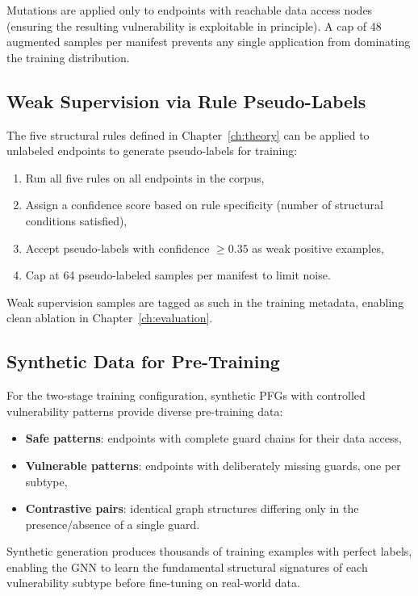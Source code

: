 Mutations are applied only to endpoints with reachable data access nodes (ensuring the resulting vulnerability is exploitable in principle). A cap of 48 augmented samples per manifest prevents any single application from dominating the training distribution.

\subsection{Weak Supervision via Rule Pseudo-Labels}

The five structural rules defined in Chapter~\ref{ch:theory} can be applied to unlabeled endpoints to generate pseudo-labels for training:

\begin{enumerate}
    \item Run all five rules on all endpoints in the corpus,
    \item Assign a confidence score based on rule specificity (number of structural conditions satisfied),
    \item Accept pseudo-labels with confidence $\geq 0.35$ as weak positive examples,
    \item Cap at 64 pseudo-labeled samples per manifest to limit noise.
\end{enumerate}

Weak supervision samples are tagged as such in the training metadata, enabling clean ablation in Chapter~\ref{ch:evaluation}.

\subsection{Synthetic Data for Pre-Training}

For the two-stage training configuration, synthetic PFGs with controlled vulnerability patterns provide diverse pre-training data:
\begin{itemize}
    \item \textbf{Safe patterns}: endpoints with complete guard chains for their data access,
    \item \textbf{Vulnerable patterns}: endpoints with deliberately missing guards, one per subtype,
    \item \textbf{Contrastive pairs}: identical graph structures differing only in the presence/absence of a single guard.
\end{itemize}

Synthetic generation produces thousands of training examples with perfect labels, enabling the GNN to learn the fundamental structural signatures of each vulnerability subtype before fine-tuning on real-world data.

